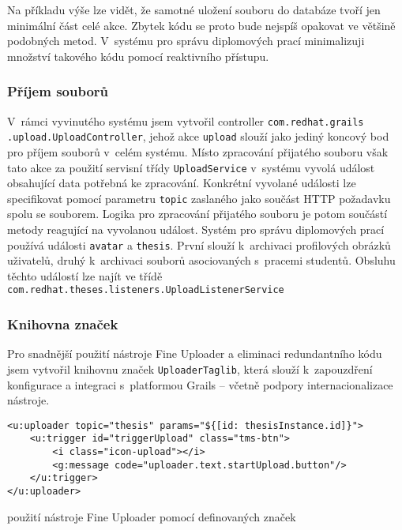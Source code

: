 Na příkladu výše lze vidět, že samotné uložení souboru do databáze tvoří jen minimální část celé akce. Zbytek kódu se proto bude nejspíš opakovat ve většině podobných metod. V~systému pro správu diplomových prací minimalizuji množství takového kódu pomocí reaktivního přístupu.

\subsubsection{\textbf{Příjem souborů}}
V~rámci vyvinutého systému jsem vytvořil controller \texttt{com.redhat.grails\\.upload.UploadController}, jehož akce \texttt{upload} slouží jako jediný koncový bod pro příjem souborů v~celém systému. Místo zpracování přijatého souboru však tato akce za použití servisní třídy \texttt{UploadService} v~systému vyvolá událost obsahující data potřebná ke zpracování. Konkrétní vyvolané události lze specifikovat pomocí parametru \texttt{topic} zaslaného jako součást HTTP požadavku spolu se souborem. Logika pro zpracování přijatého souboru je potom součástí metody reagující na vyvolanou událost. Systém pro správu diplomových prací používá události \texttt{avatar} a \texttt{thesis}. První slouží k~archivaci profilových obrázků uživatelů, druhý k~archivaci souborů asociovaných s~pracemi studentů. Obsluhu těchto událostí lze najít ve třídě \texttt{com.redhat.theses.listeners.UploadListenerService}

\subsubsection{\textbf{Knihovna značek}}
Pro snadnější použití nástroje Fine Uploader a eliminaci redundantního kódu jsem vytvořil knihovnu značek \texttt{UploaderTaglib}, která slouží k~zapouzdření konfigurace a integraci s~platformou Grails -- včetně podpory internacionalizace nástroje.
\begin{example}
\centering
\begin{lstlisting}
<u:uploader topic="thesis" params="${[id: thesisInstance.id]}">
    <u:trigger id="triggerUpload" class="tms-btn">
        <i class="icon-upload"></i>
        <g:message code="uploader.text.startUpload.button"/>
    </u:trigger>
</u:uploader>
\end{lstlisting}
\caption{použití nástroje Fine Uploader pomocí definovaných značek}
\end{example}

